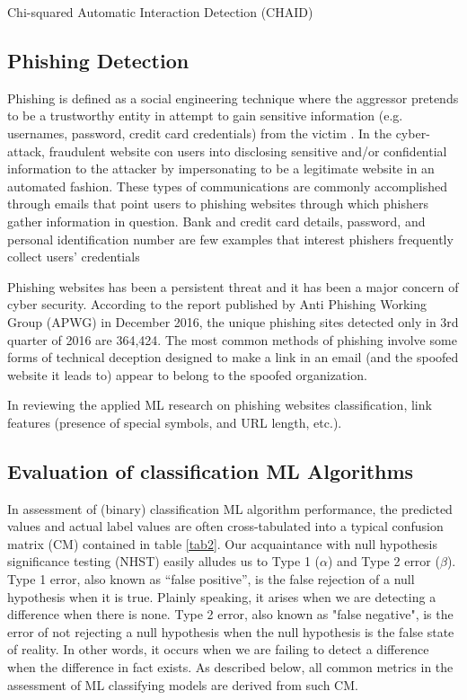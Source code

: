 \documentclass[deca,nonblindrev]{informs3} %
\begin{document}
Chi-squared Automatic Interaction Detection (CHAID)
\subsection{Phishing Detection}
Phishing is defined as a social engineering technique where the aggressor pretends to be a trustworthy entity in attempt to gain sensitive information (e.g. usernames, password, credit card credentials) from the victim \citep{Jagatic2007}. In the cyber-attack, fraudulent website con users into disclosing sensitive and/or confidential information to the attacker by impersonating to be a legitimate website in an automated fashion.  These types of communications are commonly accomplished through emails that point users to phishing websites through which phishers gather information in question.  Bank and credit card details, password, and personal identification number are few examples that interest phishers frequently collect users’ credentials \citep{jakobsson2006phishing}

Phishing websites has been a persistent threat and it has been a major concern of cyber security.  According to the report published by Anti Phishing Working Group (APWG) in December 2016, the unique phishing sites detected only in 3rd quarter of 2016 are 364,424. The most common methods of phishing involve some forms of technical deception designed to make a link in an email (and the spoofed website it leads to) appear to belong to the spoofed organization. 

In reviewing the applied ML research on phishing websites classification,    link features (presence of special symbols, and URL length, etc.).

 



\subsection{Evaluation of classification  ML Algorithms}

In assessment of (binary) classification  ML algorithm performance, the predicted  values and actual label values  are often cross-tabulated into  a typical confusion matrix (CM) contained in  table \ref{tab2}. Our acquaintance with null hypothesis  significance  testing (NHST) easily alludes us to Type 1 ($\alpha$) and  Type 2 error ($\beta$). Type 1 error,  also known as “false positive”, is the false rejection of a null hypothesis when it is true. Plainly speaking, it arises when we are detecting a difference when there is none. Type 2  error, also known as "false negative", is the error of not rejecting a null hypothesis when the null hypothesis is the false state of reality. In other words, it occurs when we are failing to detect a difference when the difference in fact exists. As described below, all common metrics in the assessment of ML classifying models are derived from such CM.
\end{document}
